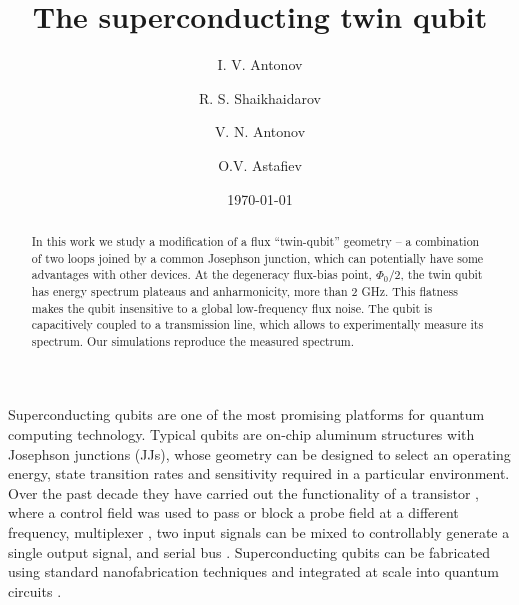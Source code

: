 \documentclass[%
reprint,
superscriptaddress,
bibnotes,
amsmath,
amssymb,
aps,
showkeys,
prb,
]{revtex4-2}
\begin{document}

\title{The superconducting twin qubit}

\author{I.  V.  Antonov}   

\author{R. S.  Shaikhaidarov} 

\author{V.  N.  Antonov}   

\author{O.V.  Astafiev}   

\date{\today}%

\begin{abstract}
  In this work  we study a modification of  a flux ``twin-qubit'' geometry --  a combination of
  two loops joined by a common Josephson  junction, which can potentially have some advantages
  with other devices.  At the degeneracy flux-bias point, $ \Phi_0/2 $, the twin qubit has energy
  spectrum plateaus and anharmonicity, more than 2 GHz. This flatness makes the qubit insensitive to
  a global  low-frequency flux  noise.  The  qubit is capacitively  coupled to  a transmission
  line, which  allows to experimentally  measure its  spectrum. Our simulations  reproduce the
  measured spectrum.
\end{abstract}


\maketitle

Superconducting  qubits  are  one  of  the most  promising  platforms  for  quantum  computing
technology. Typical  qubits are  on-chip aluminum structures  with Josephson  junctions (JJs),
whose geometry  can be  designed to  select an  operating energy,  state transition  rates and
sensitivity required in a particular environment.  Over  the past decade they have carried out
the   functionality   of   a   transistor   \cite{Astafiev_2010,   Hoi_2011,   Abdumalikov_2010,
  Astafiev_2010_2},  where a  control field  was used  to pass or block a  probe field  at a
different  frequency,  multiplexer  \cite{H_nigl_Decrinis_2018},  two  input signals  can  be  mixed  to
controllably generate a single output signal, and serial bus \cite{Shen_2005}.  Superconducting
qubits can  be fabricated using  standard nanofabrication  techniques and integrated  at scale
into quantum circuits \cite{Johnson_2010}.
\end{document}
